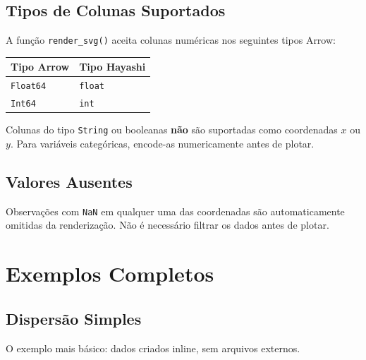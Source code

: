 \documentclass[12pt, a4paper, oneside]{book}
\newcommand{\code}[1]{\texttt{#1}}
\begin{document}
\section{Tipos de Colunas Suportados}

A função \code{render\_svg()} aceita colunas numéricas nos seguintes tipos Arrow:

\begin{center}
  \begin{tabular}{@{}ll@{}}
    \toprule
    \textbf{Tipo Arrow} & \textbf{Tipo Hayashi} \\
    \midrule
    \code{Float64}      & \code{float} \\
    \code{Int64}        & \code{int} \\
    \bottomrule
  \end{tabular}
\end{center}

\begin{warnbox}[title={\textbf{Atenção:} Colunas categóricas}]
  Colunas do tipo \code{String} ou booleanas \textbf{não} são suportadas como
  coordenadas $x$ ou $y$. Para variáveis categóricas, encode-as numericamente
  antes de plotar.
\end{warnbox}

\section{Valores Ausentes}

Observações com \code{NaN} em qualquer uma das coordenadas são automaticamente
omitidas da renderização. Não é necessário filtrar os dados antes de plotar.

\chapter{Exemplos Completos}

\section{Dispersão Simples}

O exemplo mais básico: dados criados inline, sem arquivos externos.
\end{document}
